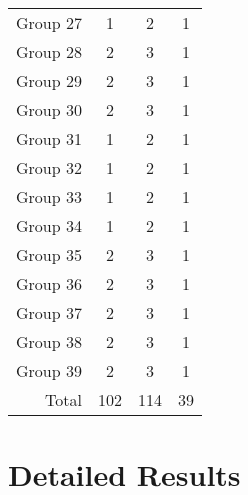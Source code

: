 \begin{table}[H]
\begin{tabular}{@{}rccc@{}}
        Group 27 & 1                                         & 2                                          & 1                                      \\
        Group 28 & 2                                         & 3                                          & 1                                      \\
        Group 29 & 2                                         & 3                                          & 1                                      \\
        Group 30 & 2                                         & 3                                          & 1                                      \\
        Group 31 & 1                                         & 2                                          & 1                                      \\
        Group 32 & 1                                         & 2                                          & 1                                      \\
        Group 33 & 1                                         & 2                                          & 1                                      \\
        Group 34 & 1                                         & 2                                          & 1                                      \\
        Group 35 & 2                                         & 3                                          & 1                                      \\
        Group 36 & 2                                         & 3                                          & 1                                      \\
        Group 37 & 2                                         & 3                                          & 1                                      \\
        Group 38 & 2                                         & 3                                          & 1                                      \\
        Group 39 & 2                                         & 3                                          & 1                                      \\ \midrule
        Total    & 102                                       & 114                                        & 39                                     \\
        \bottomrule
    \end{tabular}
\end{table}


\section{Detailed Results}


